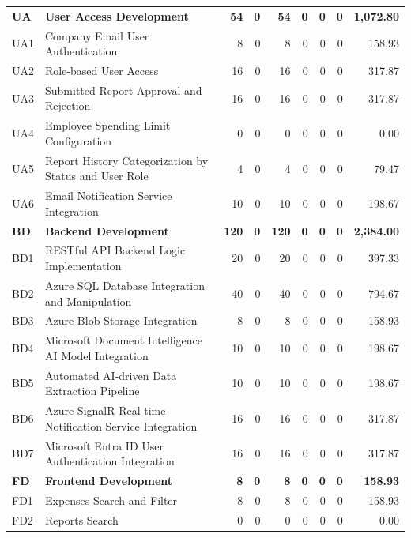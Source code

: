 \begin{longtable}{@{}l p{8.5cm} r r r r r r r@{}}
\rowcolor{gray!10}
\textbf{UA} & \textbf{User Access Development} & \textbf{54} & \textbf{0} & \textbf{54} & \textbf{0} & \textbf{0} & \textbf{0} & \textbf{1,072.80} \\
\rowcolor{gray!05}
UA1 & Company Email User Authentication & 8 & 0 & 8 & 0 & 0 & 0 & 158.93 \\
\rowcolor{gray!05}
UA2 & Role-based User Access & 16 & 0 & 16 & 0 & 0 & 0 & 317.87 \\
\rowcolor{gray!05}
UA3 & Submitted Report Approval and Rejection & 16 & 0 & 16 & 0 & 0 & 0 & 317.87 \\
\rowcolor{gray!05}
UA4 & Employee Spending Limit Configuration & 0 & 0 & 0 & 0 & 0 & 0 & 0.00 \\
\rowcolor{gray!05} 
UA5 & Report History Categorization by Status and User Role & 4 & 0 & 4 & 0 & 0 & 0 & 79.47 \\
\rowcolor{gray!05}
UA6 & Email Notification Service Integration & 10 & 0 & 10 & 0 & 0 & 0 & 198.67 \\

\rowcolor{gray!20}
\textbf{BD} & \textbf{Backend Development} & \textbf{120} & \textbf{0} & \textbf{120} & \textbf{0} & \textbf{0} & \textbf{0} & \textbf{2,384.00} \\
\rowcolor{gray!05}
BD1 & RESTful API Backend Logic Implementation & 20 & 0 & 20 & 0 & 0 & 0 & 397.33 \\
\rowcolor{gray!05}
BD2 & Azure SQL Database Integration and Manipulation & 40 & 0 & 40 & 0 & 0 & 0 & 794.67 \\
\rowcolor{gray!05}
BD3 & Azure Blob Storage Integration & 8 & 0 & 8 & 0 & 0 & 0 & 158.93 \\
\rowcolor{gray!05}
BD4 & Microsoft Document Intelligence AI Model Integration & 10 & 0 & 10 & 0 & 0 & 0 & 198.67 \\
\rowcolor{gray!05}
BD5 & Automated AI-driven Data Extraction Pipeline & 10 & 0 & 10 & 0 & 0 & 0 & 198.67 \\
\rowcolor{gray!05}
BD6 & Azure SignalR Real-time Notification Service Integration & 16 & 0 & 16 & 0 & 0 & 0 & 317.87 \\
\rowcolor{gray!05}
BD7 & Microsoft Entra ID User Authentication Integration & 16 & 0 & 16 & 0 & 0 & 0 & 317.87 \\

\rowcolor{gray!20}
\textbf{FD} & \textbf{Frontend Development} & \textbf{8} & \textbf{0} & \textbf{8} & \textbf{0} & \textbf{0} & \textbf{0} & \textbf{158.93} \\
\rowcolor{gray!05}
FD1 & Expenses Search and Filter & 8 & 0 & 8 & 0 & 0 & 0 & 158.93 \\
\rowcolor{gray!05}
FD2 & Reports Search & 0 & 0 & 0 & 0 & 0 & 0 & 0.00 \\
\end{longtable}
\normalsize